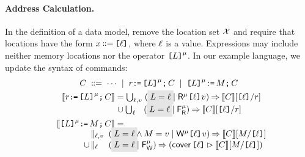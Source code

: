\paragraph{Address Calculation.}
In the definition of a data model, remove the location set $\mathcal{X}$ and require
that locations have the form $x\!\!\;\mathrel{\mathord{\vcentcolon}\mkern-1mu\mathord{\vcentcolon}\mathord{{=}}}\;\!\!\texttt{[}\ell\texttt{]}$, where $\ell$
is a value.  Expressions may include neither memory locations nor the
operator $\texttt{[}L\texttt{]}^{\mu}$.
In our example language, we update the syntax of commands:
\begingroup
\allowdisplaybreaks
\begin{gather*}
  \aCmd
  \BNFDEF \cdots
  \BNFSEP \aReg\GETS\REF{\cExp}^{\amode}\SEMI \aCmd 
  \BNFSEP \REF{\cExp}^{\amode}\GETS\aExp\SEMI \aCmd
  \\
\begin{aligned}
  \sem{\aReg\GETS\REF{\cExp}^\amode\SEMI \aCmd} & =
  \textstyle\bigcup_{\cVal,\aVal}\; (\;\mathhl{\cExp=\cVal} \mid \DRmode{\REF{\cVal}}\aVal) \prefix \sem{\aCmd}[\REF{\cVal}/\aReg]  
  \\[-.5ex] & \mkern2mu\cup
  \textstyle\bigcup_{\cVal\phantom{,\aVal}}\; (\;\mathhl{\cExp=\cVal}\mid\DFR{\amode}) \prefix
  \sem{\aCmd}[\REF{\cVal}/\aReg]
  \\
  \sem{\REF{\cExp}^\amode\GETS\aExp\SEMI \aCmd} & =
  \\[-1ex]
  &\mkern-65mu\hbox to 0pt{$\begin{aligned}
    &\textstyle\parallel_{\cVal,\aVal}\;(\;\mathhl{\cExp=\cVal} \land \aExp=\aVal \mid \DWmode{\REF{\cVal}}\aVal) \prefix \sem{\aCmd}[\aExp/\REF{\cVal}]
    \\[-.5ex]  \cup\!&
    \textstyle\parallel_{\cVal\phantom{,\aVal}}\; (\;\mathhl{\cExp=\cVal}\mid\DFW{\amode}) \prefix
    (\relfilt{\REF{\cVal}} \sem{\aCmd}[\aExp/\REF{\cVal}])    
  \end{aligned}$}
\end{aligned}
\end{gather*}
\endgroup


